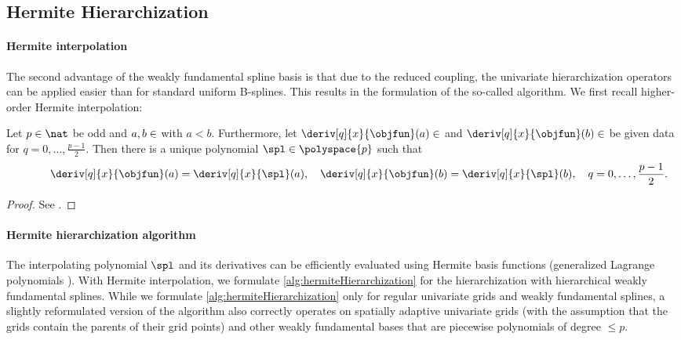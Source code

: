 \subsection{Hermite Hierarchization}
\label{sec:455hermiteHierarchization}

\paragraph{Hermite interpolation}

The second advantage of the weakly fundamental spline basis
is that due to the reduced coupling,
the univariate hierarchization operators can be applied easier
than for standard uniform B-splines.
This results in the formulation of the so-called
 algorithm.
We first recall higher-order Hermite interpolation:

\begin{lemma}
  \label{lemma:hermiteInterpolation}
  Let $p \in \nat$ be odd and $a, b \in \real$ with $a < b$.
  Furthermore, let
  $\deriv[q]{x}{\objfun}(a) \in \real$ and
  $\deriv[q]{x}{\objfun}(b) \in \real$ be given data
  for $q = 0, \dotsc, \frac{p-1}{2}$.
  Then there is a unique polynomial $\spl \in \polyspace{p}$ such that
  \begin{equation}
    \deriv[q]{x}{\objfun}(a)
    = \deriv[q]{x}{\spl}(a),\quad
    \deriv[q]{x}{\objfun}(b)
    = \deriv[q]{x}{\spl}(b),\quad
    q = 0, \dotsc, \frac{p-1}{2}.
    \hspace*{-10mm}
  \end{equation}
\end{lemma}

\begin{proof}
  See \cite{Freund07Stoer}.
\end{proof}

\paragraph{Hermite hierarchization algorithm}

The interpolating polynomial $\spl$ and its derivatives can be
efficiently evaluated using Hermite basis functions
(generalized Lagrange polynomials \cite{Freund07Stoer}).
With Hermite interpolation, we formulate
\cref{alg:hermiteHierarchization}
for the hierarchization with hierarchical weakly fundamental splines.
While we formulate \cref{alg:hermiteHierarchization}
only for regular univariate grids and weakly fundamental splines,
a slightly reformulated version of the algorithm
also correctly operates on spatially adaptive univariate grids
(with the assumption that the grids contain the parents of their grid points)
and other weakly fundamental bases that are
piecewise polynomials of degree $\le p$.

